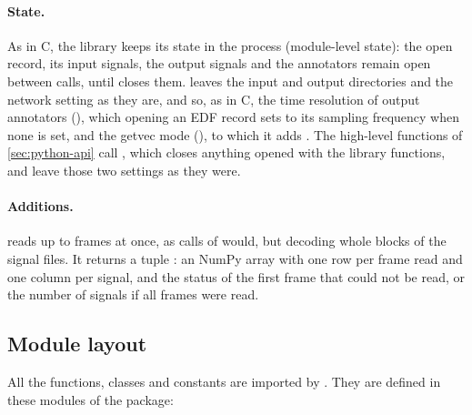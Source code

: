 \paragraph{State.} As in C, the library keeps its state in the process (module-level
state): the open record, its input signals, the output signals and the annotators remain
open between calls, until  closes them.  leaves the
input and output directories and the network setting as they are, and so, as in C, the
time resolution of output annotators (), which opening an EDF record sets
to its sampling frequency when none is set, and the getvec mode (), to
which it adds . The high-level functions of \cref{sec:python-api} call
, which closes anything opened with the library functions, and leave
those two settings as they were.

\paragraph{Additions.}  reads up to  frames at once, as
 calls of  would, but decoding whole blocks of the signal files. It
returns a tuple : an  NumPy array with one row per frame
read and one column per signal, and the  status of the first frame that
could not be read, or the number of signals if all  frames were read.

\subsection{Module layout}

All the functions, classes and constants are imported by . They are
defined in these modules of the package:

